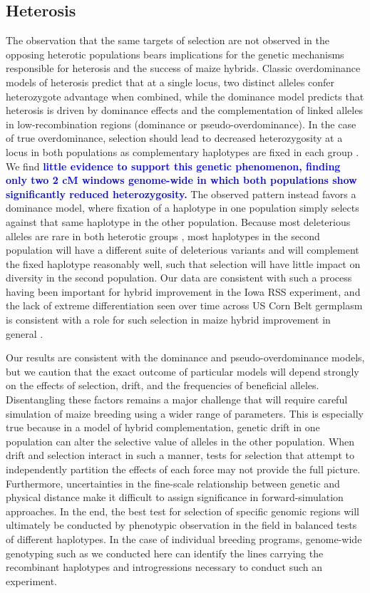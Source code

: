 \documentclass[twocolumn,twoside,letterpaper]{article}
\newcommand{\rev}[1]{\textcolor{blue}{\bf #1}}
\begin{document}
\subsection*{Heterosis}

The observation that the same targets of selection are not observed in the opposing heterotic populations bears implications for the genetic mechanisms responsible for heterosis and the success of maize hybrids. 
Classic overdominance models of heterosis predict that at a single locus, two distinct alleles confer heterozygote advantage when combined, while the dominance model predicts that heterosis is driven by dominance effects and the complementation of linked alleles in low-recombination regions (dominance or pseudo-overdominance). 
In the case of true overdominance,  selection should lead to decreased heterozygosity at a locus in both populations as complementary haplotypes are fixed in each group \rev{\citep[e.g.][]{guo2014maize}}.
We find \rev{little evidence to support this genetic phenomenon, finding only two 2 cM windows genome-wide in which both populations show significantly reduced heterozygosity.} 
The observed pattern instead favors a dominance model, where fixation of a haplotype in one population simply selects against that same haplotype in the other population. 
Because most deleterious alleles are rare in both heterotic groups \citep{Mezmouk2014}, most haplotypes in the second population will have a different suite of deleterious variants and will complement the fixed haplotype reasonably well, such that selection will have little impact on diversity in the second population. 
Our data are consistent with such a process having been important for hybrid improvement in the Iowa RSS experiment, and the lack of extreme differentiation seen over time across US Corn Belt germplasm is consistent with a role for such selection in maize hybrid improvement in general \citep{van2012historical}.

Our results are consistent with the dominance and pseudo-overdominance models, but we caution that the exact outcome of particular models will depend strongly on the effects of selection, drift, and the frequencies of beneficial alleles. 
Disentangling these factors remains a major challenge that will require careful simulation of maize breeding using a wider range of parameters. 
This is especially true because in a model of hybrid complementation, genetic drift in one population can alter the selective value of alleles in the other population. 
When drift and selection interact in such a manner, tests for selection that attempt to independently partition the effects of each force may not provide the full picture. Furthermore, uncertainties in the fine-scale relationship between genetic and physical distance make it difficult to assign significance in forward-simulation approaches. 
In the end, the best test for selection of specific genomic regions will ultimately be conducted by phenotypic observation in the field in balanced tests of different haplotypes. 
In the case of individual breeding programs, genome-wide genotyping such as we conducted here can identify the lines carrying the recombinant haplotypes and introgressions necessary to conduct such an experiment. 
\end{document}
